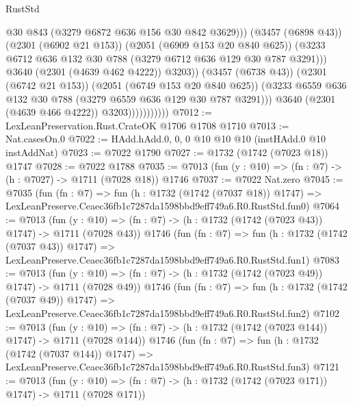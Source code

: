\begin{lexlean}{RustStd}
\begin{coremodule}
                                      @30
                                      @843
                                      (@3279 @6872 @636 @156 @30 @842 @3629)))
                                  (@3457 (@6898 @43))
                                  (@2301 (@6902 @21 @153))
                                  (@2051 (@6909 @153 @20 @840 @625))
                                  (@3233
                                    @6712
                                    @636
                                    @132
                                    @30
                                    @788
                                    (@3279 @6712 @636 @129 @30 @787 @3291)))
                                @3640
                                (@2301 (@4639 @462 @4222))
                                @3203))
                            (@3457 (@6738 @43))
                            (@2301 (@6742 @21 @153))
                            (@2051 (@6749 @153 @20 @840 @625))
                            (@3233 @6559 @636 @132 @30 @788 (@3279 @6559 @636 @129 @30 @787 @3291)))
                          @3640
                          (@2301 (@4639 @466 @4222))
                          @3203)))))))))))
@7012 := LexLeanPreservation.Rust.CrateOK @1706 @1708 @1710
@7013 := Nat.casesOn.{0}
@7022 := HAdd.hAdd.{0, 0, 0} @10 @10 @10 (instHAdd.{0} @10 instAddNat)
@7023 := @7022 @1790
@7027 := @1732 (@1742 (@7023 @18)) @1747
@7028 := @7022 @1788
@7035 := @7013 (fun (y : @10) => (fn : @7) -> (h : @7027) -> @1711 (@7028 @18)) @1746
@7037 := @7022 Nat.zero
@7045 := @7035
    (fun (fn : @7) =>
    fun (h : @1732 (@1742 (@7037 @18)) @1747) =>
    LexLeanPreserve.Ceaec36fb1c7287da1598bbd9eff749a6.R0.RustStd.fun0)
@7064 := @7013
    (fun (y : @10) => (fn : @7) -> (h : @1732 (@1742 (@7023 @43)) @1747) -> @1711 (@7028 @43))
    @1746
    (fun (fn : @7) =>
    fun (h : @1732 (@1742 (@7037 @43)) @1747) =>
    LexLeanPreserve.Ceaec36fb1c7287da1598bbd9eff749a6.R0.RustStd.fun1)
@7083 := @7013
    (fun (y : @10) => (fn : @7) -> (h : @1732 (@1742 (@7023 @49)) @1747) -> @1711 (@7028 @49))
    @1746
    (fun (fn : @7) =>
    fun (h : @1732 (@1742 (@7037 @49)) @1747) =>
    LexLeanPreserve.Ceaec36fb1c7287da1598bbd9eff749a6.R0.RustStd.fun2)
@7102 := @7013
    (fun (y : @10) => (fn : @7) -> (h : @1732 (@1742 (@7023 @144)) @1747) -> @1711 (@7028 @144))
    @1746
    (fun (fn : @7) =>
    fun (h : @1732 (@1742 (@7037 @144)) @1747) =>
    LexLeanPreserve.Ceaec36fb1c7287da1598bbd9eff749a6.R0.RustStd.fun3)
@7121 := @7013
    (fun (y : @10) => (fn : @7) -> (h : @1732 (@1742 (@7023 @171)) @1747) -> @1711 (@7028 @171))

\end{coremodule}
\end{lexlean}

